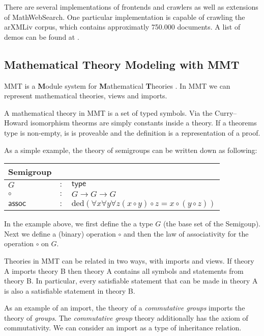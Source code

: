 \documentclass[11pt]{article}
\begin{document}
There are several implementations of frontends and crawlers as well as extensions of MathWebSearch. One particular implementation is capable of crawling the arXMLiv corpus, which contains approximatly 750.000 documents. A list of demos can be found at \cite{URL:MWSDemo}.

\subsection{Mathematical Theory Modeling with MMT}
\label{sec:mws:mmt}

MMT is a \textbf{M}odule system for \textbf{M}athematical \textbf{T}heories \cite{RabKoh:WSMSML13}. In MMT we can represent mathematical theories, views and imports.

A mathematical theory in MMT is a set of typed symbols. Via the Curry–Howard isomorphism theorms are simply constants inside a theory. If a theorems type is non-empty, is is proveable and the definition is a representation of a proof.

As a simple example, the theory of semigroups can be written down as following:

\begin{tabular}{|l c l|}
  \hline
  \textsf{Semigroup} & &\\\hline
  $G$ & $:$ & $\scriptstyle \mathsf{type}$\\
  $\circ$ & $:$ & $ G \rightarrow G \rightarrow G$\\
  $\scriptstyle \mathsf{assoc}$& $:$ & $ \text{ded}\left( \forall x \forall y \forall z (x\circ y)\circ z=x\circ (y\circ z) \right)$\\\hline
\end{tabular}

In the example above, we first define the a type $G$ (the base set of the Semigoup). Next we define a (binary) operation $\circ$ and then the law of associativity for the operation $\circ$ on $G$.

Theories in MMT can be related in two ways, with imports and views. If theory A imports theory B then theory A contains all symbols and statements from theory B. In particular, every satisfiable statement that can be made in theory A is also a satisfiable statement in theory B.

As an example of an import, the theory of a \textit{commutative groups} imports the theory of \textit{groups}. The \textit{commutative group} theory additionally has the axiom of commutativity. We can consider an import as a type of inheritance relation.
\end{document}
